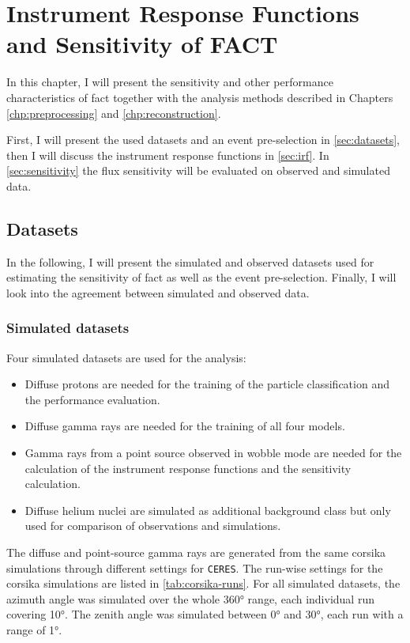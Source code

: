 \chapter{Instrument Response Functions and Sensitivity of FACT}\label{chp:performance}

In this chapter, I will present the sensitivity and other performance characteristics of
\gls{fact} together with the analysis methods described in Chapters \ref{chp:preprocessing} and
\ref{chp:reconstruction}.

First, I will present the used datasets and an event pre-selection in \autoref{sec:datasets},
then I will discuss the instrument response functions in \autoref{sec:irf}.
In \autoref{sec:sensitivity} the flux sensitivity will be evaluated on observed and simulated
data.

\section{Datasets}\label{sec:datasets}

In the following, I will present the simulated and observed datasets
used for estimating the sensitivity of \gls{fact} as well as the
event pre-selection.
Finally, I will look into the agreement between simulated and observed data.


\subsection{Simulated datasets}

Four simulated datasets are used for the analysis:
\begin{itemize}
  \item Diffuse protons are needed for the training of the particle classification 
    and the performance evaluation.
  \item Diffuse gamma rays are needed for the training of all four models.
  \item Gamma rays from a point source observed in wobble mode are needed
    for the calculation of the instrument response functions and the sensitivity calculation.
  \item Diffuse helium nuclei are simulated as additional background class but only 
    used for comparison of observations and simulations.
\end{itemize}
The diffuse and point-source gamma rays are generated from the same \gls{corsika} 
simulations through different settings for \texttt{CERES}.
The run-wise settings for the corsika simulations are listed in \autoref{tab:corsika-runs}.
For all simulated datasets, the azimuth angle was simulated over the whole
\ang{360} range, each individual run covering \ang{10}.
The zenith angle was simulated between \ang{0} and \ang{30}, each run with a
range of \ang{1}.

